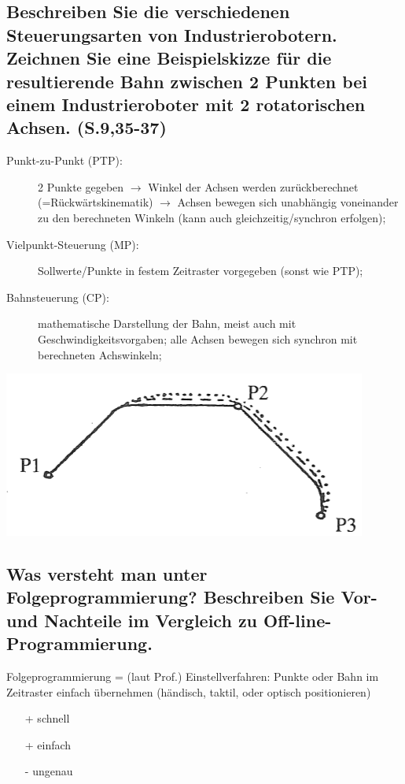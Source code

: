 \subsection{Beschreiben Sie die verschiedenen Steuerungsarten von Industrierobotern. Zeichnen
  Sie eine Beispielskizze für die resultierende Bahn zwischen 2 Punkten bei einem 
  Industrieroboter mit 2 rotatorischen Achsen. (S.9,35-37)}
\begin{description}
\item[Punkt-zu-Punkt (PTP):] 2 Punkte gegeben $\rightarrow$ Winkel der Achsen werden 
  zurückberechnet (=Rückwärtskinematik) $\rightarrow$ Achsen bewegen sich unabhängig 
  voneinander zu den berechneten Winkeln (kann auch gleichzeitig/synchron erfolgen);
\item[Vielpunkt-Steuerung (MP):] Sollwerte/Punkte in festem Zeitraster vorgegeben (sonst
  wie PTP);
\item[Bahnsteuerung (CP):] mathematische Darstellung der Bahn, meist auch mit 
  Geschwindigkeitsvorgaben; alle Achsen bewegen sich synchron mit berechneten Achswinkeln;
\end{description}
\includegraphics[width=.4\textwidth]{pics/ptp_bsp}

\subsection{Was versteht man unter Folgeprogrammierung? Beschreiben Sie Vor- und Nachteile im Vergleich zu Off-line-Programmierung.}
Folgeprogrammierung = (laut Prof.) Einstellverfahren: Punkte oder Bahn im Zeitraster einfach übernehmen (händisch, taktil, oder optisch positionieren)
\begin{itemize}
	\item[+] schnell
	\item[+] einfach
	\item[-] ungenau
\end{itemize}

